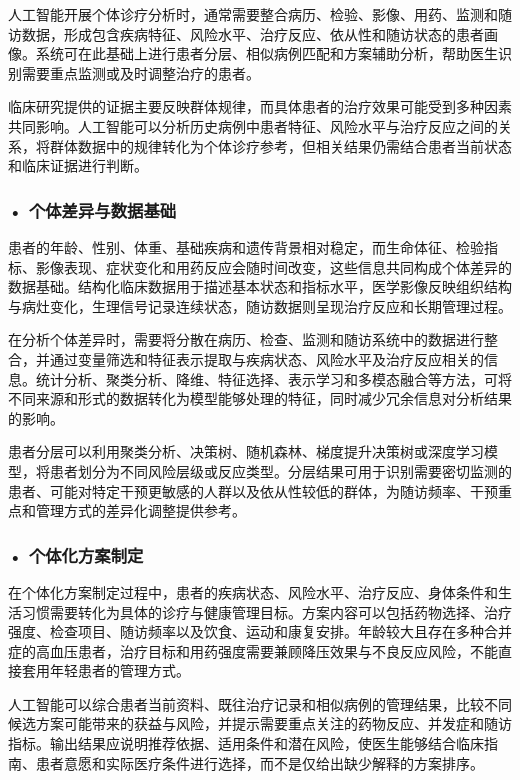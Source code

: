 人工智能开展个体诊疗分析时，通常需要整合病历、检验、影像、用药、监测和随访数据，形成包含疾病特征、风险水平、治疗反应、依从性和随访状态的患者画像。系统可在此基础上进行患者分层、相似病例匹配和方案辅助分析，帮助医生识别需要重点监测或及时调整治疗的患者。

临床研究提供的证据主要反映群体规律，而具体患者的治疗效果可能受到多种因素共同影响。人工智能可以分析历史病例中患者特征、风险水平与治疗反应之间的关系，将群体数据中的规律转化为个体诊疗参考，但相关结果仍需结合患者当前状态和临床证据进行判断。


\subsubsection*{\textbf{• 个体差异与数据基础}}

患者的年龄、性别、体重、基础疾病和遗传背景相对稳定，而生命体征、检验指标、影像表现、症状变化和用药反应会随时间改变，这些信息共同构成个体差异的数据基础。结构化临床数据用于描述基本状态和指标水平，医学影像反映组织结构与病灶变化，生理信号记录连续状态，随访数据则呈现治疗反应和长期管理过程。

在分析个体差异时，需要将分散在病历、检查、监测和随访系统中的数据进行整合，并通过变量筛选和特征表示提取与疾病状态、风险水平及治疗反应相关的信息。统计分析、聚类分析、降维、特征选择、表示学习和多模态融合等方法，可将不同来源和形式的数据转化为模型能够处理的特征，同时减少冗余信息对分析结果的影响。

患者分层可以利用聚类分析、决策树、随机森林、梯度提升决策树或深度学习模型，将患者划分为不同风险层级或反应类型。分层结果可用于识别需要密切监测的患者、可能对特定干预更敏感的人群以及依从性较低的群体，为随访频率、干预重点和管理方式的差异化调整提供参考。


\subsubsection*{\textbf{• 个体化方案制定}}

在个体化方案制定过程中，患者的疾病状态、风险水平、治疗反应、身体条件和生活习惯需要转化为具体的诊疗与健康管理目标。方案内容可以包括药物选择、治疗强度、检查项目、随访频率以及饮食、运动和康复安排。年龄较大且存在多种合并症的高血压患者，治疗目标和用药强度需要兼顾降压效果与不良反应风险，不能直接套用年轻患者的管理方式。

人工智能可以综合患者当前资料、既往治疗记录和相似病例的管理结果，比较不同候选方案可能带来的获益与风险，并提示需要重点关注的药物反应、并发症和随访指标。输出结果应说明推荐依据、适用条件和潜在风险，使医生能够结合临床指南、患者意愿和实际医疗条件进行选择，而不是仅给出缺少解释的方案排序。

